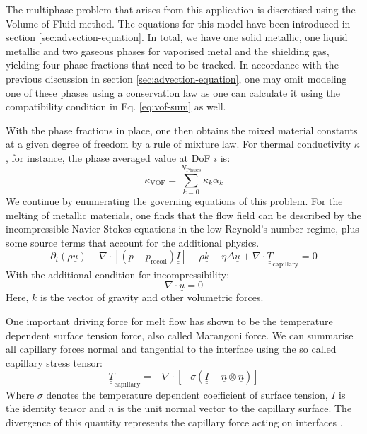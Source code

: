 \documentclass[sn-mathphys,Numbered]{sn-jnl}%
\theoremstyle{thmstyleone}%
\theoremstyle{thmstyletwo}%
\theoremstyle{thmstylethree}%
\begin{document}
The multiphase problem that arises from this application is discretised using the Volume of Fluid method.
The equations for this model have been introduced in section \ref{sec:advection-equation}.
In total, we have one solid metallic, one liquid metallic and two gaseous phases for vaporised metal and the shielding gas, yielding four phase fractions that need to be tracked.
In accordance with the previous discussion in section \ref{sec:advection-equation}, one may omit modeling one of these phases using a conservation law as one can calculate it using the compatibility condition in Eq. \ref{eq:vof-sum} as well.

With the phase fractions in place, one then obtains the mixed material constants at a given degree of freedom by a rule of mixture law.
For thermal conductivity $\kappa$, for instance, the phase averaged value at DoF $i$ is:
\begin{equation}
    \kappa_\text{VOF} = \sum\limits_{k=0}^{N_\text{Phases}} \kappa_k \alpha_k
\end{equation}
We continue by enumerating the governing equations of this problem.
For the melting of metallic materials, one finds that the flow field can be described by the incompressible Navier Stokes equations in the low Reynold's number regime, plus some source terms that account for the additional physics.
\begin{equation}\label{eq:momentum-balance}
    \partial_t (\rho \underline{u}) + \nabla \cdot \left[\left(p - p_\text{recoil}\right) \underline{\underline{I}}\right] - \rho \underline{k} - \eta \Delta \underline{u} + \nabla \cdot \underline{\underline{T}}_\text{capillary}  = 0
\end{equation}
With the additional condition for incompressibility:
\begin{equation}\label{eq:continuity}
    \nabla \cdot \underline{u} = 0
\end{equation}
Here, $\underline{k}$ is the vector of gravity and other volumetric forces.

One important driving force for melt flow has shown to be the temperature dependent surface tension force, also called Marangoni force.
We can summarise all capillary forces normal and tangential to the interface using the so called capillary stress tensor:
\begin{equation}\label{eq:capillary-stress}
    \underline{\underline{T}}_\text{capillary} = - \nabla \cdot \left[-\sigma (\underline{\underline{I}} - \underline{n} \otimes \underline{n}) \right]
\end{equation}
Where $\sigma$ denotes the temperature dependent coefficient of surface tension, $I$ is the identity tensor and $n$ is the unit normal vector to the capillary surface.
The divergence of this quantity represents the capillary force acting on interfaces \cite{brackbillContinuumMethodModeling1992}.
\end{document}

